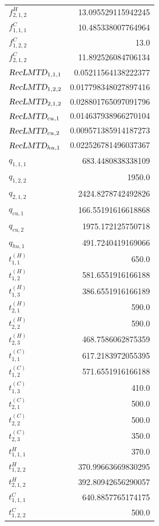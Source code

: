 \documentclass{article}%
\begin{document}
\begin{multicols*}{3}
\begin{supertabular}{lr}
	$f_{2,1,2}^{H}$ & 13.095529115942245 \\%
	$f_{1,1,1}^{C}$ & 10.485338007764964 \\%
	$f_{1,2,2}^{C}$ & 13.0 \\%
	$f_{2,1,2}^{C}$ & 11.892526084706134 \\%
	$\textsl{RecLMTD}_{1,1,1}$ & 0.05211564138222377 \\%
	$\textsl{RecLMTD}_{1,2,2}$ & 0.017798348027897416 \\%
	$\textsl{RecLMTD}_{2,1,2}$ & 0.028801765097091796 \\%
	$\textsl{RecLMTD}_{cu,1}$ & 0.014637938966270104 \\%
	$\textsl{RecLMTD}_{cu,2}$ & 0.009571385914187273 \\%
	$\textsl{RecLMTD}_{hu,1}$ & 0.022526781496037367 \\%
	$q_{1,1,1}$ & 683.4480838338109 \\%
	$q_{1,2,2}$ & 1950.0 \\%
	$q_{2,1,2}$ & 2424.8278742492826 \\%
	$q_{cu,1}$ & 166.55191616618868 \\%
	$q_{cu,2}$ & 1975.172125750718 \\%
	$q_{hu,1}$ & 491.7240419169066 \\%
	$t_{1,1}^{(H)}$ & 650.0 \\%
	$t_{1,2}^{(H)}$ & 581.6551916166188 \\%
	$t_{1,3}^{(H)}$ & 386.6551916166189 \\%
	$t_{2,1}^{(H)}$ & 590.0 \\%
	$t_{2,2}^{(H)}$ & 590.0 \\%
	$t_{2,3}^{(H)}$ & 468.7586062875359 \\%
	$t_{1,1}^{(C)}$ & 617.2183972055395 \\%
	$t_{1,2}^{(C)}$ & 571.6551916166188 \\%
	$t_{1,3}^{(C)}$ & 410.0 \\%
	$t_{2,1}^{(C)}$ & 500.0 \\%
	$t_{2,2}^{(C)}$ & 500.0 \\%
	$t_{2,3}^{(C)}$ & 350.0 \\%
	$t_{1,1,1}^{H}$ & 370.0 \\%
	$t_{1,2,2}^{H}$ & 370.99663669830295 \\%
	$t_{2,1,2}^{H}$ & 392.80942656290057 \\%
	$t_{1,1,1}^{C}$ & 640.8857765174175 \\%
	$t_{1,2,2}^{C}$ & 500.0 \\%

\end{supertabular}
\end{multicols*}
\end{document}
